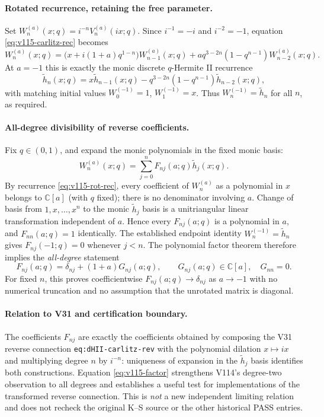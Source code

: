 \documentclass[11pt]{article}
\begin{document}
\paragraph{Rotated recurrence, retaining the free parameter.}
Set $W_n^{(a)}(x;q)=i^{-n}V_n^{(a)}(ix;q)$. Since $i^{-1}=-i$ and $i^{-2}=-1$, equation \eqref{eq:v115-carlitz-rec} becomes
\begin{equation}
 \boxed{W_n^{(a)}(x;q)=
 \bigl(x+i(1+a)q^{1-n}\bigr)W_{n-1}^{(a)}(x;q)
 +a q^{3-2n}(1-q^{n-1})W_{n-2}^{(a)}(x;q).}
 \label{eq:v115-rot-rec}
\end{equation}
At $a=-1$ this is exactly the monic discrete $q$-Hermite II recurrence
\[
 \widetilde h_n(x;q)=x\widetilde h_{n-1}(x;q)
 -q^{3-2n}(1-q^{n-1})\widetilde h_{n-2}(x;q),
\]
with matching initial values $W_0^{(-1)}=1$, $W_1^{(-1)}=x$. Thus $W_n^{(-1)}=\widetilde h_n$ for all $n$, as required.

\paragraph{All-degree divisibility of reverse coefficients.}
Fix $q\in(0,1)$, and expand the monic polynomials in the fixed monic basis:
\[
 W_n^{(a)}(x;q)=\sum_{j=0}^n F_{nj}(a;q)\widetilde h_j(x;q).
\]
By recurrence \eqref{eq:v115-rot-rec}, every coefficient of $W_n^{(a)}$ as a polynomial in $x$ belongs to $\mathbb C[a]$ (with $q$ fixed); there is no denominator involving $a$. Change of basis from $1,x,\ldots,x^n$ to the monic $\widetilde h_j$ basis is a unitriangular linear transformation independent of $a$. Hence every $F_{nj}(a;q)$ is a polynomial in $a$, and $F_{nn}(a;q)=1$ identically. The established endpoint identity $W_n^{(-1)}=\widetilde h_n$ gives $F_{nj}(-1;q)=0$ whenever $j<n$. The polynomial factor theorem therefore implies the \emph{all-degree} statement
\begin{equation}
 \boxed{F_{nj}(a;q)=\delta_{nj}+(1+a)G_{nj}(a;q),\qquad
 G_{nj}(a;q)\in\mathbb C[a],\quad G_{nn}=0.}
 \label{eq:v115-factor}
\end{equation}
For fixed $n$, this proves coefficientwise $F_{nj}(a;q)\to\delta_{nj}$ as $a\to-1$ with no numerical truncation and no assumption that the unrotated matrix is diagonal.

\paragraph{Relation to V31 and certification boundary.}
The coefficients $F_{nj}$ are exactly the coefficients obtained by composing the V31 reverse connection \texttt{eq:dHII-carlitz-rev} with the polynomial dilation $x\mapsto ix$ and multiplying degree $n$ by $i^{-n}$: uniqueness of expansion in the $\widetilde h_j$ basis identifies both constructions. Equation \eqref{eq:v115-factor} strengthens V114's degree-two observation to all degrees and establishes a useful test for implementations of the transformed reverse connection. This is \emph{not} a new independent limiting relation and does not recheck the original K--S source or the other historical PASS entries.
\end{document}
